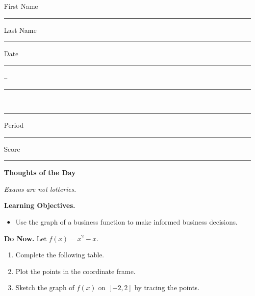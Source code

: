\documentclass[twoside, 10pt]{article}
\title{}
\date{}
\begin{document}
\noindent
{\large
First Name \rule{6em}{.1pt}Last Name \rule{6em}{.1pt} Date \rule{1.5em}{.1pt} -- \rule{1.5em}{.1pt} -- \rule{1.5em}{.1pt} Period \rule{2em}{.1pt} Score \rule{2em}{.1pt}
}
\vspace{1em}

{\noindent\bf Thoughts of the Day}
\begin{center}
{\it Exams are not lotteries.}
\end{center}

{\noindent \bf Learning Objectives.}
\begin{itemize}
\item
Use the graph of a business function to make informed business decisions.
\end{itemize}
{\noindent\bf Do Now.}
Let $f(x) = x^2 - x$.
\begin{enumerate}
    \item Complete the following table.
    \item Plot the points in the coordinate frame.
    \item Sketch the graph of $f(x)$ on $[-2, 2]$ by tracing the points.
\end{enumerate}
\end{document}
